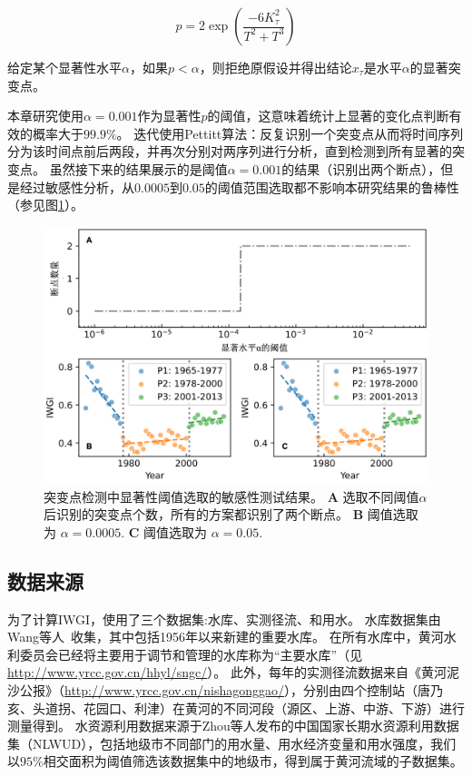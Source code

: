 \begin{equation}
    p=2 \exp \left(\frac{-6 K_{\tau}^{2}}{T^{2}+T^{3}}\right)
\end{equation}

给定某个显著性水平$\alpha$，如果$p < \alpha$，则拒绝原假设并得出结论$x_{\tau}$是水平$\alpha$的显著突变点。

本章研究使用$\alpha = 0.001$作为显著性$p$的阈值，这意味着统计上显著的变化点判断有效的概率大于$99.9\%$。
迭代使用Pettitt算法：反复识别一个突变点从而将时间序列分为该时间点前后两段，并再次分别对两序列进行分析，直到检测到所有显著的突变点。
虽然接下来的结果展示的是阈值$\alpha = 0.001$的结果（识别出两个断点），但是经过敏感性分析，从$0.0005$到$0.05$的阈值范围选取都不影响本研究结果的鲁棒性（参见图\ref{ch4:fig:sensitivity}）。

\begin{figure}[!ht] %
    \includegraphics[width=\textwidth]{img/ch4/ch4_sensitivity.png}
    \caption[突变点检测中显著性阈值选取的敏感性测试]{突变点检测中显著性阈值选取的敏感性测试结果。
    \textbf{A} 选取不同阈值$\alpha$后识别的突变点个数，所有的方案都识别了两个断点。
    \textbf{B} 阈值选取为 $\alpha=0.0005$.
    \textbf{C} 阈值选取为 $\alpha=0.05$.}\label{ch4:fig:sensitivity}
\end{figure}

\subsection{数据来源}

% 

为了计算IWGI，使用了三个数据集:水库、实测径流、和用水。
水库数据集由Wang等人~\cite{wang2019f}收集，其中包括1956年以来新建的重要水库。
在所有水库中，黄河水利委员会已经将主要用于调节和管理的水库称为``主要水库''（见\url{http://www.yrcc.gov.cn/hhyl/sngc/}）。
此外，每年的实测径流数据来自《黄河泥沙公报》（\url{http://www.yrcc.gov.cn/nishagonggao/}），分别由四个控制站（唐乃亥、头道拐、花园口、利津）在黄河的不同河段（源区、上游、中游、下游）进行测量得到。
水资源利用数据来源于Zhou等人\cite{zhou2020}发布的中国国家长期水资源利用数据集（NLWUD），包括地级市不同部门的用水量、用水经济变量和用水强度，我们以$95\%$相交面积为阈值筛选该数据集中的地级市，得到属于黄河流域的子数据集。

